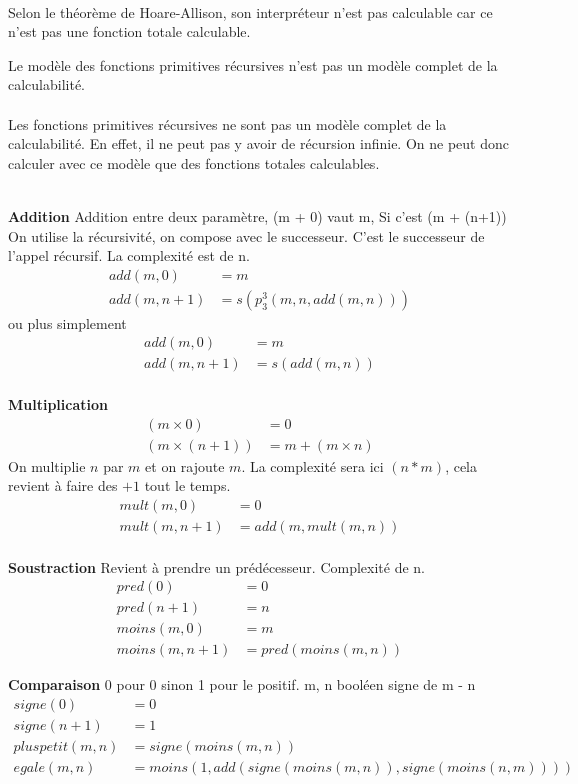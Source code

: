 \paragraph{} Selon le théorème de Hoare-Allison, son interpréteur n'est pas calculable car ce n'est pas une fonction totale calculable.

\begin{myprop}
	Le modèle des fonctions primitives récursives n'est pas un modèle complet de la calculabilité.
\end{myprop}
\paragraph{} Les fonctions primitives récursives ne sont pas un modèle complet de
	la calculabilité. En effet, il ne peut pas y avoir de récursion
	infinie. On ne peut donc calculer avec ce modèle que des fonctions
	totales calculables.

\begin{myexem}\ \\
	\textbf{Addition}
	Addition entre deux paramètre, (m + 0) vaut m,
	Si c’est (m + (n+1)) On utilise la récursivité, on compose avec le successeur. C’est le successeur de l’appel récursif.
	La complexité est de n.
	\begin{align*}
		add (m, 0) &= m \\
		add (m, n+1) &= s (p^3_3(m, n, add (m, n)))
	\end{align*}
	ou plus simplement
	\begin{align*}
		add (m, 0) &= m \\
		add (m, n+1) &= s (add (m, n))
	\end{align*}
	\\
	\textbf{Multiplication}
	\begin{align*}
	(m\times 0) &= 0\\
	(m \times (n+1)) &= m + (m\times n)
	\end{align*}
	On multiplie $n$ par $m$ et on rajoute $m$. La complexité sera ici $(n*m)$, cela revient à faire des $+1$ tout le temps.
	\begin{align*}
	mult (m, 0) &= 0 \\
	mult (m, n+1) &= add (m, mult(m, n))
	\end{align*}
	\\
	\textbf{Soustraction} Revient à prendre un prédécesseur.
	Complexité de n. 
	\begin{align*}
	pred (0) &= 0 \\
	pred (n+1) &= n \\
	moins (m, 0) &= m \\
	moins (m, n+1) &= pred (moins (m, n))
	\end{align*}
	
	\textbf{Comparaison} 0 pour 0 sinon 1 pour le positif.
	m, n booléen signe de m - n
	\begin{align*}
	signe (0) &= 0 \\
	signe (n+1) &= 1 \\
	pluspetit (m, n) &= signe(moins(m, n)) \\
	egale (m, n) &= moins (1, add(signe (moins (m, n)), signe (moins (n, m))))
	\end{align*}
\end{myexem}


